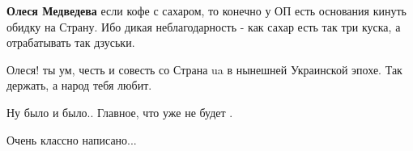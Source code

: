 \begin{itemize}
\begin{itemize}
\textbf{Олеся Медведева} если кофе с сахаром, то конечно у ОП есть основания кинуть обидку на Страну. Ибо дикая неблагодарность - как сахар есть так три куска, а отрабатывать так дзуськи.
\end{itemize} %

Олеся! ты ум, честь и совесть со Страна ua в нынешней Украинской эпохе. Так держать, а народ тебя любит.

Ну было и было..
Главное, что уже не будет
.

Очень классно написано...

\end{itemize} %
